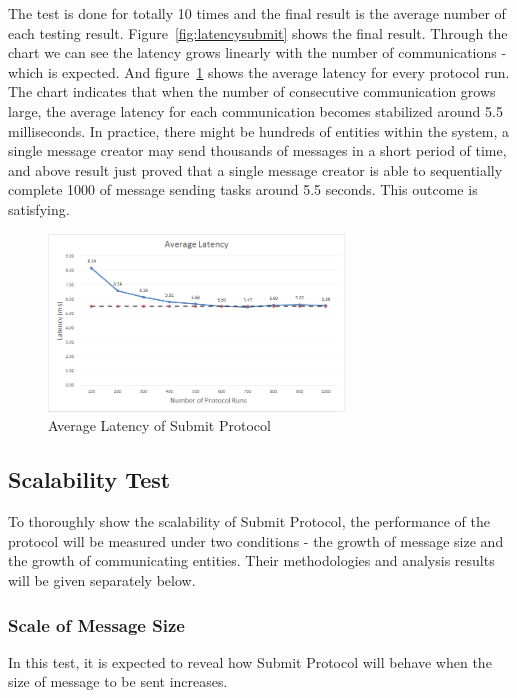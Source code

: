 The test is done for totally 10 times and the final result is the average number of each testing result. Figure~\ref{fig:latencysubmit} shows the final result. Through the chart we can see the latency grows linearly with the number of communications - which is expected. And figure~\ref{fig:averagelatencysubmit} shows the average latency for every protocol run. The chart indicates that when the number of consecutive communication grows large, the average latency for each communication becomes stabilized around 5.5 milliseconds. In practice, there might be hundreds of entities within the system, a single message creator may send thousands of messages in a short period of time, and above result just proved that a single message creator is able to sequentially complete 1000 of message sending tasks around 5.5 seconds. This outcome is satisfying. 

\begin{figure}[h!]
\centering
\includegraphics[width=0.7\textwidth,natwidth=744,natheight=447]{figures/averagelatencysubmit.png}
\caption{Average Latency of Submit Protocol}
\label{fig:averagelatencysubmit}
\end{figure}

\subsection{Scalability Test}
To thoroughly show the scalability of Submit Protocol, the performance of the protocol will be measured under two conditions - the growth of message size and the growth of communicating entities. Their methodologies and analysis results will be given separately below.

\subsubsection{Scale of Message Size}
In this test, it is expected to reveal how Submit Protocol will behave when the size of message to be sent increases.

